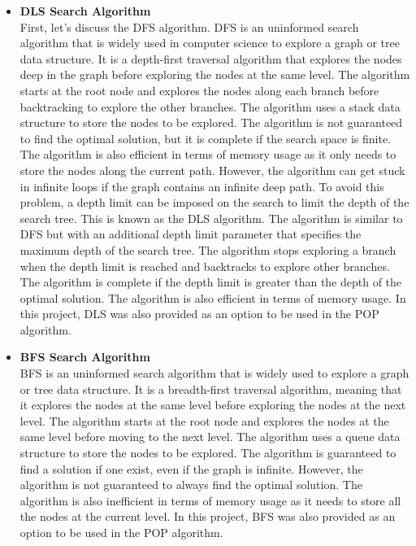 \begin{itemize}
    \item \textbf{\acf{DLS} Search Algorithm} \label{subsubsec:dls}\\
          First, let's discuss the \ac{DFS} algorithm.
          \ac{DFS} is an uninformed search algorithm that is widely used in computer science to explore a graph or tree data structure. It is a depth-first traversal algorithm that explores the nodes deep in the graph before exploring the nodes at the same level. The algorithm starts at the root node and explores the nodes along each branch before backtracking to explore the other branches. The algorithm uses a stack data structure to store the nodes to be explored. The algorithm is not guaranteed to find the optimal solution, but it is complete if the search space is finite. The algorithm is also efficient in terms of memory usage as it only needs to store the nodes along the current path. However, the algorithm can get stuck in infinite loops if the graph contains an infinite deep path. To avoid this problem, a depth limit can be imposed on the search to limit the depth of the search tree. This is known as the \acf{DLS} algorithm. The algorithm is similar to \ac{DFS} but with an additional depth limit parameter that specifies the maximum depth of the search tree. The algorithm stops exploring a branch when the depth limit is reached and backtracks to explore other branches. The algorithm is complete if the depth limit is greater than the depth of the optimal solution. The algorithm is also efficient in terms of memory usage. In this project, \ac{DLS} was also provided as an option to be used in the \ac{POP} algorithm.

    \item \textbf{\acf{BFS} Search Algorithm} \label{subsubsec:bfs}\\
          \ac{BFS} is an uninformed search algorithm that is widely used to explore a graph or tree data structure. It is a breadth-first traversal algorithm, meaning that it explores the nodes at the same level before exploring the nodes at the next level. The algorithm starts at the root node and explores the nodes at the same level before moving to the next level. The algorithm uses a queue data structure to store the nodes to be explored. The algorithm is guaranteed to find a solution if one exist, even if the graph is infinite. However, the algorithm is not guaranteed to always find the optimal solution. The algorithm is also inefficient in terms of memory usage as it needs to store all the nodes at the current level. In this project, \ac{BFS} was also provided as an option to be used in the \ac{POP} algorithm.

\end{itemize}

